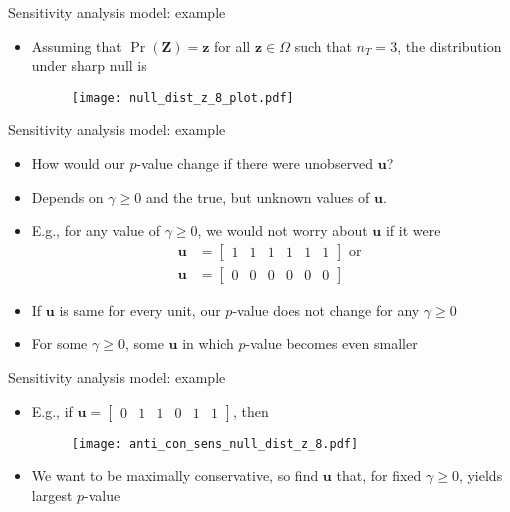 \documentclass[table, xcolor={dvipsnames}, 9pt]{beamer}
\theoremstyle{newstyle}
\begin{document}
\begin{frame}{Sensitivity analysis model: example}
\vfill
\begin{itemize} \vfill
\item Assuming that $\Pr(\bm{Z}) = \bm{z}$ for all $\bm{z} \in \Omega$ such that $n_T = 3$, the distribution under sharp null is \vfill
\begin{figure}
\texttt{[image: null\_dist\_z\_8\_plot.pdf]}
\end{figure} \vfill
\end{itemize}\vfill
\end{frame}
\begin{frame}{Sensitivity analysis model: example}
\vfill
\begin{itemize}
\item How would our $p$-value change if there were unobserved $\bm{u}$? \vfill 
\item Depends on $\gamma \geq 0$ and the true, but unknown values of $\bm{u}$. \vfill
\item E.g., for any value of $\gamma \geq 0$, we would not worry about $\bm{u}$ if it were \vfill
\begin{align*}
\bm{u} & = \begin{bmatrix} 1 & 1 & 1 & 1 & 1 & 1 \end{bmatrix} \text{ or } \\
\bm{u} & = \begin{bmatrix} 0 & 0 & 0 & 0 & 0 & 0 \end{bmatrix}
\end{align*} \vfill
\item If $\bm{u}$ is same for every unit, our $p$-value does not change for any $\gamma \geq 0$ \vfill
\item For some $\gamma \geq 0$, some $\bm{u}$ in which $p$-value becomes even smaller \vfill
\end{itemize} \vfill
\end{frame}
\begin{frame}{Sensitivity analysis model: example}
\vfill
\begin{itemize} \vfill
\item E.g., if $\bm{u} = \begin{bmatrix} 0 & 1 & 1 & 0 & 1 & 1 \end{bmatrix}$, then \vfill
\begin{figure}
\texttt{[image: anti\_con\_sens\_null\_dist\_z\_8.pdf]}
\end{figure} \vfill
\item We want to be maximally conservative, so find $\bm{u}$ that, for fixed $\gamma \geq 0$, yields largest $p$-value \vfill
\end{itemize} \vfill
\end{frame}
\end{document}
